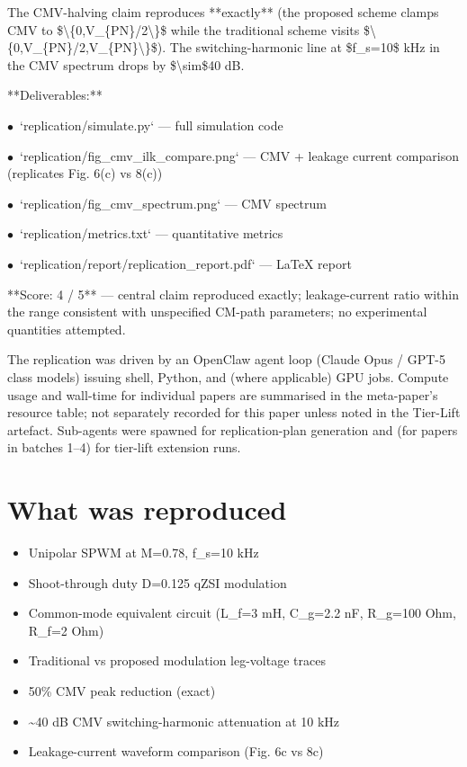 \documentclass[11pt]{article}
\begin{document}
The CMV-halving claim reproduces **exactly** (the proposed scheme clamps CMV to \$\textbackslash{}\{0,V\_\{PN\}/2\textbackslash{}\}\$ while the traditional scheme visits \$\textbackslash{}\{0,V\_\{PN\}/2,V\_\{PN\}\textbackslash{}\}\$). The switching-harmonic line at \$f\_s=10\$ kHz in the CMV spectrum drops by \$\textbackslash{}sim\$40 dB.

**Deliverables:**
\par$\bullet$\ `replication/simulate.py` — full simulation code
\par$\bullet$\ `replication/fig\_cmv\_ilk\_compare.png` — CMV + leakage current comparison (replicates Fig. 6(c) vs 8(c))
\par$\bullet$\ `replication/fig\_cmv\_spectrum.png` — CMV spectrum
\par$\bullet$\ `replication/metrics.txt` — quantitative metrics
\par$\bullet$\ `replication/report/replication\_report.pdf` — LaTeX report

**Score: 4 / 5** — central claim reproduced exactly; leakage-current ratio within the range consistent with unspecified CM-path parameters; no experimental quantities attempted.
\normalsize

The replication was driven by an OpenClaw agent loop (Claude Opus / GPT-5 class models) issuing shell, Python, and (where applicable) GPU jobs. Compute usage and wall-time for individual papers are summarised in the meta-paper's resource table; not separately recorded for this paper unless noted in the Tier-Lift artefact. Sub-agents were spawned for replication-plan generation and (for papers in batches 1--4) for tier-lift extension runs.

\section{What was reproduced}
\begin{itemize}
\item Unipolar SPWM at M=0.78, f\_s=10 kHz
\item Shoot-through duty D=0.125 qZSI modulation
\item Common-mode equivalent circuit (L\_f=3 mH, C\_g=2.2 nF, R\_g=100 Ohm, R\_f=2 Ohm)
\item Traditional vs proposed modulation leg-voltage traces
\item 50\% CMV peak reduction (exact)
\item \textasciitilde{}40 dB CMV switching-harmonic attenuation at 10 kHz
\item Leakage-current waveform comparison (Fig. 6c vs 8c)
\end{itemize}
\end{document}
